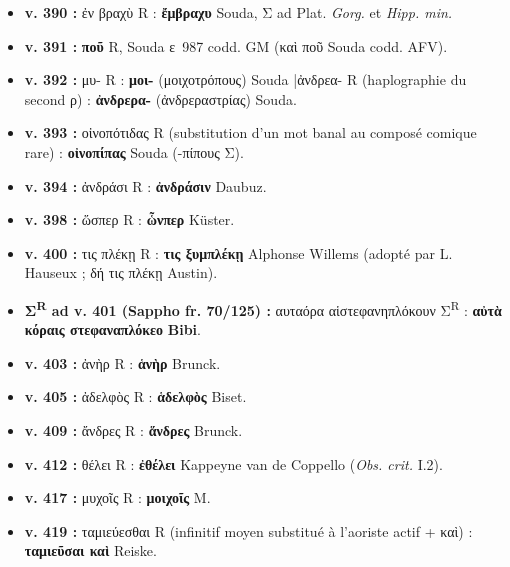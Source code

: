\documentclass[10pt, a4paper, twoside]{book}
\renewcommand{\_}{\origunderscore\penalty0\relax}
\providecommand{\italique}[1]{\emph{#1}}
\providecommand{\lecon}[1]{\textbf{#1}}
\providecommand{\Mon}{M}
\providecommand{\espApp}{\hspace{0.5em}|\hspace{0.5em}}
\begin{document}
\begin{itemize}
\begin{itemize}
    \item \textbf{v. 390 :} ἐν βραχὺ R : \lecon{ἔμβραχυ} Souda, Σ ad Plat. \italique{Gorg.} et \italique{Hipp. min.}
    \item \textbf{v. 391 :} \lecon{ποῦ} R, Souda ε~987 codd. GM (καὶ ποῦ Souda codd. AFV).
    \item \textbf{v. 392 :} μυ- R : \lecon{μοι-} (μοιχοτρόπους) Souda \espApp ἀνδρεα- R (haplographie du second ρ) : \lecon{ἀνδρερα-} (ἀνδρεραστρίας) Souda.
    \item \textbf{v. 393 :} οἰνοπότιδας R (substitution d'un mot banal au composé comique rare) : \lecon{οἰνοπίπας} Souda (-πίπους Σ).
    \item \textbf{v. 394 :} ἀνδράσι R : \lecon{ἀνδράσιν} Daubuz.
    \item \textbf{v. 398 :} ὥσπερ R : \lecon{ὧνπερ} Küster.
    \item \textbf{v. 400 :} τις πλέκῃ R : \lecon{τις ξυμπλέκῃ} Alphonse Willems (adopté par L. Hauseux ; δή τις πλέκῃ Austin).
    \item \textbf{Σ\textsuperscript{R} ad v. 401 (Sappho fr. 70/125) :} αυταόρα αἱστεφανηπλόκουν Σ\textsuperscript{R} : \lecon{αὐτὰ κόραις στεφαναπλόκεο} \lecon{Bibi}.
    \item \textbf{v. 403 :} ἀνὴρ R : \lecon{ἁνὴρ} Brunck.
    \item \textbf{v. 405 :} ἀδελφὸς R : \lecon{ἁδελφὸς} Biset.
    \item \textbf{v. 409 :} ἄνδρες R : \lecon{ἅνδρες} Brunck.
    \item \textbf{v. 412 :} θέλει R : \lecon{ἐθέλει} Kappeyne van de Coppello (\italique{Obs. crit.} I.2).
    \item \textbf{v. 417 :} μυχοῖς R : \lecon{μοιχοῖς} \Mon{}.
    \item \textbf{v. 419 :} ταμιεύεσθαι R (infinitif moyen substitué à l'aoriste actif + καὶ) : \lecon{ταμιεῦσαι καὶ} Reiske.
  \end{itemize}
\end{itemize}
\end{document}
